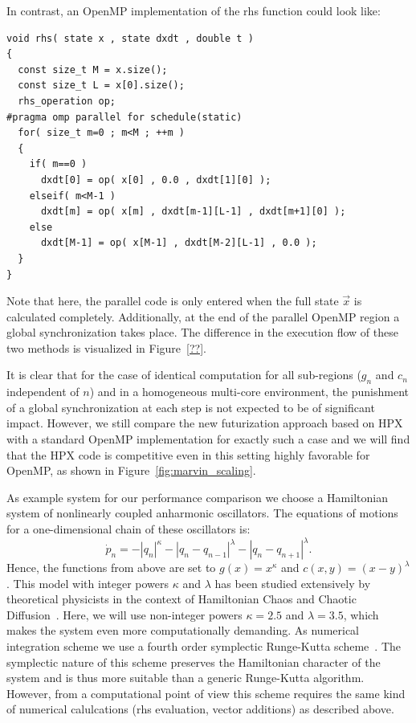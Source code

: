 \documentclass[a4wide,10pt]{scrartcl}
\begin{document}
In contrast, an OpenMP implementation of the rhs function could look like:
\begin{lstlisting}
void rhs( state x , state dxdt , double t )
{
  const size_t M = x.size();
  const size_t L = x[0].size();
  rhs_operation op;
#pragma omp parallel for schedule(static)
  for( size_t m=0 ; m<M ; ++m )
  {
    if( m==0 )
      dxdt[0] = op( x[0] , 0.0 , dxdt[1][0] );
    elseif( m<M-1 )
      dxdt[m] = op( x[m] , dxdt[m-1][L-1] , dxdt[m+1][0] );
    else
      dxdt[M-1] = op( x[M-1] , dxdt[M-2][L-1] , 0.0 );
  }
}
\end{lstlisting}
Note that here, the parallel code is only entered when the full state $\vec x$ is calculated completely.
Additionally, at the end of the parallel OpenMP region a global synchronization takes place.
The difference in the execution flow of these two methods is visualized in Figure~\ref{??}.

It is clear that for the case of identical computation for all sub-regions ($g_n$ and $c_n$ independent of $n$) and in a homogeneous multi-core environment, the punishment of a global synchronization at each step is not expected to be of significant impact.
However, we still compare the new futurization approach based on HPX with a standard OpenMP implementation for exactly such a case and we will find that the HPX code is competitive even in this setting highly favorable for OpenMP, as shown in Figure~\ref{fig:marvin_scaling}.

As example system for our performance comparison we choose a Hamiltonian system of nonlinearly coupled anharmonic oscillators.
The equations of motions for a one-dimensional chain of these oscillators is:
\begin{equation}
 \dot p_n = -|q_n|^\kappa - |q_n-q_{n-1}|^\lambda - |q_n-q_{n+1}|^\lambda.
\end{equation} 
Hence, the functions from above are set to $g(x) = x^\kappa$ and $c(x,y)=(x-y)^\lambda$.
This model with integer powers $\kappa$ and $\lambda$ has been studied extensively by theoretical physicists in the context of Hamiltonian Chaos and Chaotic Diffusion~\cite{blabla}.
Here, we will use non-integer powers $\kappa=2.5$ and $\lambda=3.5$, which makes the system even more computationally demanding.
As numerical integration scheme we use a fourth order symplectic Runge-Kutta scheme~\cite{mclachlan}.
The symplectic nature of this scheme preserves the Hamiltonian character of the system and is thus more suitable than a generic Runge-Kutta algorithm.
However, from a computational point of view this scheme requires the same kind of numerical calulcations (rhs evaluation, vector additions) as described above.
\end{document}
